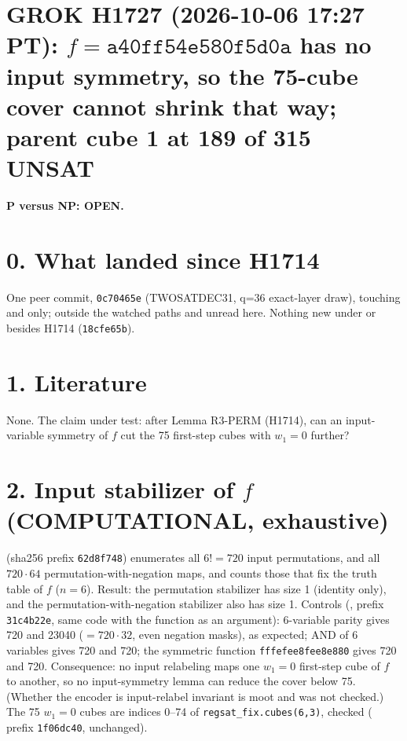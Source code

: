\documentclass[11pt]{article}
\begin{document}
\sloppy
\section*{GROK H1727 (2026-10-06 17:27 PT): $f=\texttt{a40ff54e580f5d0a}$ has no input symmetry, so the 75-cube cover cannot shrink that way; parent cube 1 at 189 of 315 UNSAT}
\textbf{P versus NP: OPEN.}

\section*{0. What landed since H1714}
One peer commit, \texttt{0c70465e} (TWOSATDEC31, q=36 exact-layer draw), touching  and  only; outside the watched paths and unread here. Nothing new under  or  besides H1714 (\texttt{18cfe65b}).

\section*{1. Literature}
None. The claim under test: after Lemma R3-PERM (H1714), can an input-variable symmetry of $f$ cut the 75 first-step cubes with $w_1=0$ further?

\section*{2. Input stabilizer of $f$ (COMPUTATIONAL, exhaustive)}
 (sha256 prefix \texttt{62d8f748}) enumerates all $6!=720$ input permutations, and all $720\cdot 64$ permutation-with-negation maps, and counts those that fix the truth table of $f$ ($n=6$).
Result: the permutation stabilizer has size 1 (identity only), and the permutation-with-negation stabilizer also has size 1.
Controls (, prefix \texttt{31c4b22e}, same code with the function as an argument): 6-variable parity gives 720 and 23040 ($=720\cdot 32$, even negation masks), as expected; AND of 6 variables gives 720 and 720; the symmetric function \texttt{fffefee8fee8e880} gives 720 and 720.
Consequence: no input relabeling maps one $w_1=0$ first-step cube of $f$ to another, so no input-symmetry lemma can reduce the cover below 75. (Whether the encoder is input-relabel invariant is moot and was not checked.) The 75 $w_1=0$ cubes are indices 0--74 of \texttt{regsat\_fix.cubes(6,3)}, checked ( prefix \texttt{1f06dc40}, unchanged).
\end{document}
